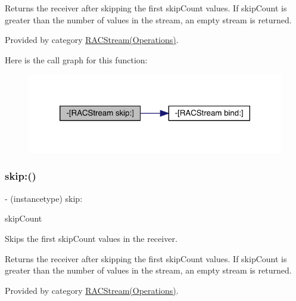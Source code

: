 Returns the receiver after skipping the first {\ttfamily skip\+Count} values. If {\ttfamily skip\+Count} is greater than the number of values in the stream, an empty stream is returned. 

Provided by category \mbox{\hyperlink{category_r_a_c_stream_07_operations_08_a1525f1607d8ff7f04a0afc1a5193436a}{R\+A\+C\+Stream(\+Operations)}}.

Here is the call graph for this function\+:\nopagebreak
\begin{figure}[H]
\begin{center}
\leavevmode
\includegraphics[width=320pt]{interface_r_a_c_stream_a1525f1607d8ff7f04a0afc1a5193436a_cgraph}
\end{center}
\end{figure}
\mbox{\label{interface_r_a_c_stream_a1525f1607d8ff7f04a0afc1a5193436a}} 
\subsubsection{\texorpdfstring{skip\+:()}{skip:()}\hspace{0.1cm}{\footnotesize\ttfamily [3/3]}}
{\footnotesize\ttfamily -\/ (instancetype) skip\+: \begin{DoxyParamCaption}\item[{(N\+S\+U\+Integer)}]{skip\+Count }\end{DoxyParamCaption}}

Skips the first {\ttfamily skip\+Count} values in the receiver.

Returns the receiver after skipping the first {\ttfamily skip\+Count} values. If {\ttfamily skip\+Count} is greater than the number of values in the stream, an empty stream is returned. 

Provided by category \mbox{\hyperlink{category_r_a_c_stream_07_operations_08_a1525f1607d8ff7f04a0afc1a5193436a}{R\+A\+C\+Stream(\+Operations)}}.

\mbox{\label{interface_r_a_c_stream_a008935d03ebc55b40b461dc080cddd38}} 
